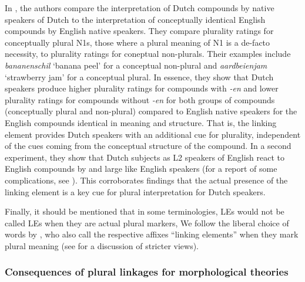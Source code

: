 In \textcite{BangaEa2013b}, the authors compare the interpretation of Dutch compounds by native speakers of Dutch to the interpretation of conceptually identical English compounds by English native speakers.
They compare plurality ratings for conceptually plural N1s, \ie those where a plural meaning of N1 is a de-facto necessity, to plurality ratings for coneptual non-plurals.
Their examples include \textit{bananenschil} `banana peel' for a conceptual non-plural and \textit{aardbeienjam} `strawberry jam' for a conceptual plural.
In essence, they show that Dutch speakers produce higher plurality ratings for compounds with \textit{-en} and lower plurality ratings for compounds without \textit{-en} for both groups of compounds (conceptually plural and non-plural) compared to English native speakers for the English compounds identical in meaning and structure.
That is, the linking element provides Dutch speakers with an additional cue for plurality, independent of the cues coming from the conceptual structure of the compound.
In a second experiment, they show that Dutch subjects as L2 speakers of English react to English compounds by and large like English speakers (for a report of some complications, see \citealt[211]{BangaEa2013b}).
This corroborates findings that the actual presence of the linking element is a key cue for plural interpretation for Dutch speakers.

Finally, it should be mentioned that in some terminologies, LEs would not be called LEs when they are actual plural markers,
We follow the liberal choice of words by \textcite{BangaEa2013b}, who also call the respective affixes ``linking elements'' when they mark plural meaning (see \citealt[196]{BangaEa2013b} for a discussion of stricter views).


\subsubsection{Consequences of plural linkages for morphological theories}

